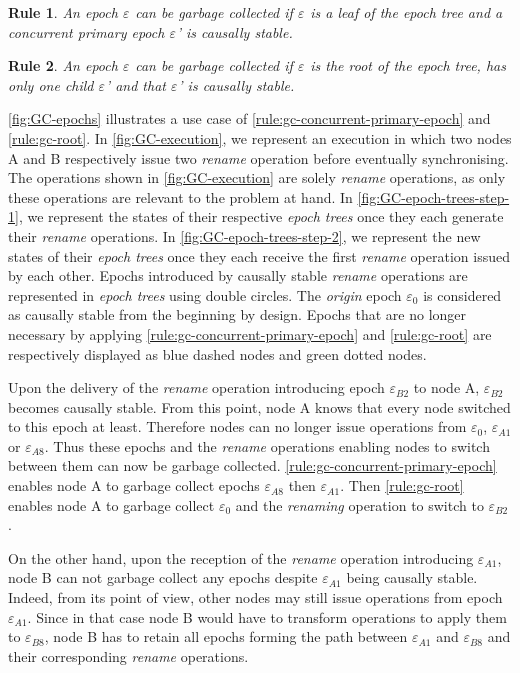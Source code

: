 \documentclass[10pt,journal,compsoc]{IEEEtran}
\newtheorem{myrule}{Rule}
\newcommand{\epoch}[1]{$\varepsilon_{#1}$}
\begin{document}
\begin{myrule}
    \label{rule:gc-concurrent-primary-epoch}
    An epoch \epoch{} can be garbage collected if \epoch{} is a leaf of the epoch tree and a concurrent primary epoch \epoch{}' is causally stable.
\end{myrule}

\begin{myrule}
    \label{rule:gc-root}
    An epoch \epoch{} can be garbage collected if \epoch{} is the root of the epoch tree, has only one child \epoch{}' and that \epoch{}' is causally stable.
\end{myrule}

\autoref{fig:GC-epochs} illustrates a use case of \autoref{rule:gc-concurrent-primary-epoch} and \autoref{rule:gc-root}.
In \autoref{fig:GC-execution}, we represent an execution in which two nodes A and B respectively issue two \emph{rename} operation before eventually synchronising.
The operations shown in \autoref{fig:GC-execution} are solely \emph{rename} operations, as only these operations are relevant to the problem at hand.
In \autoref{fig:GC-epoch-trees-step-1}, we represent the states of their respective \emph{epoch trees} once they each generate their \emph{rename} operations.
In \autoref{fig:GC-epoch-trees-step-2}, we represent the new states of their \emph{epoch trees} once they each receive the first \emph{rename} operation issued by each other.
Epochs introduced by causally stable \emph{rename} operations are represented in \emph{epoch trees} using double circles.
The \emph{origin} epoch \epoch{0} is considered as causally stable from the beginning by design.
Epochs that are no longer necessary by applying \autoref{rule:gc-concurrent-primary-epoch} and \autoref{rule:gc-root} are respectively displayed as blue dashed nodes and green dotted nodes.

Upon the delivery of the \emph{rename} operation introducing epoch \epoch{B2} to node A, \epoch{B2} becomes causally stable.
From this point, node A knows that every node switched to this epoch at least.
Therefore nodes can no longer issue operations from \epoch{0}, \epoch{A1} or \epoch{A8}.
Thus these epochs and the \emph{rename} operations enabling nodes to switch between them can now be garbage collected.
\autoref{rule:gc-concurrent-primary-epoch} enables node A to garbage collect epochs \epoch{A8} then \epoch{A1}.
Then \autoref{rule:gc-root} enables node A to garbage collect \epoch{0} and the \emph{renaming} operation to switch to \epoch{B2}.

On the other hand, upon the reception of the \emph{rename} operation introducing \epoch{A1}, node B can not garbage collect any epochs despite \epoch{A1} being causally stable.
Indeed, from its point of view, other nodes may still issue operations from epoch \epoch{A1}.
Since in that case node B would have to transform operations to apply them to \epoch{B8}, node B has to retain all epochs forming the path between \epoch{A1} and \epoch{B8} and their corresponding \emph{rename} operations.
\end{document}
